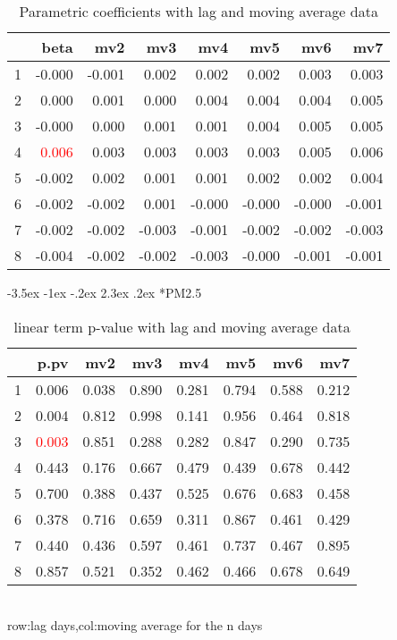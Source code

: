 \documentclass[a4paper, 12pt]{article}
\makeatletter
\def\large{\fontsize{14}{20}\selectfont}
\renewcommand\subsection{\@startsection {subsection}{1}{\z@}%
                                   {-3.5ex \@plus -1ex \@minus -.2ex}%
                                   {2.3ex \@plus.2ex}%
                                   {\centering\normalfont\large\bfseries}}
\makeatother
\begin{document}
\begin{table}[h]
\centering
\caption{Parametric coefficients with lag and moving average data}
\begin{tabular}{rrrrrrrr}
  \hline
 & beta & mv2 & mv3 & mv4 & mv5 & mv6 & mv7 \\
  \hline
1 & -0.000 & -0.001 & 0.002 & 0.002 & 0.002 & 0.003 & 0.003 \\
  2 & 0.000 & 0.001 & 0.000 & 0.004 & 0.004 & 0.004 & 0.005 \\
  3 & -0.000 & 0.000 & 0.001 & 0.001 & 0.004 & 0.005 & 0.005 \\
  4 & \textcolor{red}{0.006} & 0.003 & 0.003 & 0.003 & 0.003 & 0.005 & 0.006 \\
  5 & -0.002 & 0.002 & 0.001 & 0.001 & 0.002 & 0.002 & 0.004 \\
  6 & -0.002 & -0.002 & 0.001 & -0.000 & -0.000 & -0.000 & -0.001 \\
  7 & -0.002 & -0.002 & -0.003 & -0.001 & -0.002 & -0.002 & -0.003 \\
  8 & -0.004 & -0.002 & -0.002 & -0.003 & -0.000 & -0.001 & -0.001 \\
   \hline
\end{tabular}
\end{table}
\clearpage
\subsection*{PM2.5}
\begin{table}[h]
\centering
\caption{linear term p-value with lag and moving average data}
\begin{tabular}{rrrrrrrr}
  \hline
 & p.pv & mv2 & mv3 & mv4 & mv5 & mv6 & mv7 \\
  \hline
1 & 0.006 & 0.038 & 0.890 & 0.281 & 0.794 & 0.588 & 0.212 \\
  2 & 0.004 & 0.812 & 0.998 & 0.141 & 0.956 & 0.464 & 0.818 \\
  3 &\textcolor{red}{0.003} & 0.851 & 0.288 & 0.282 & 0.847 & 0.290 & 0.735 \\
  4 & 0.443 & 0.176 & 0.667 & 0.479 & 0.439 & 0.678 & 0.442 \\
  5 & 0.700 & 0.388 & 0.437 & 0.525 & 0.676 & 0.683 & 0.458 \\
  6 & 0.378 & 0.716 & 0.659 & 0.311 & 0.867 & 0.461 & 0.429 \\
  7 & 0.440 & 0.436 & 0.597 & 0.461 & 0.737 & 0.467 & 0.895 \\
  8 & 0.857 & 0.521 & 0.352 & 0.462 & 0.466 & 0.678 & 0.649 \\
   \hline
\end{tabular}
\\row:lag days,col:moving average for the n days
\end{table}
\end{document}
